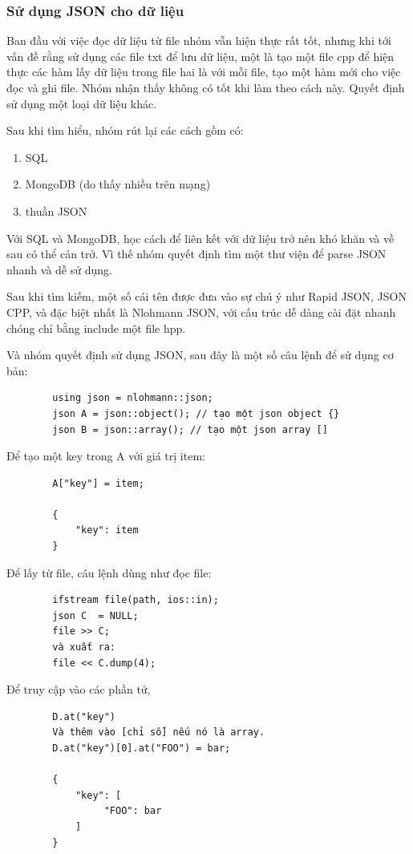 \documentclass[12pt,a4paper]{report}
\begin{document}
		\subsubsection{Sử dụng JSON cho dữ liệu}
		Ban đầu với việc đọc dữ liệu từ file nhóm vẫn hiện thực rất tốt, nhưng khi tới vấn đề rằng sử dụng các file txt để lưu dữ liệu, một là tạo một file cpp để hiện thực các hàm lấy dữ liệu trong file hai là với mỗi file, tạo một hàm mới cho việc đọc và ghi file. Nhóm nhận thấy không có tốt khi làm theo cách này. Quyết định sử dụng một loại dữ liệu khác. \par
		Sau khi tìm hiểu, nhóm rút lại các cách gồm có:
		\begin{enumerate}
			\item SQL
			\item MongoDB (do thấy nhiều trên mạng)
			\item thuần JSON
		\end{enumerate}
		Với SQL và MongoDB, học cách để liên kết với dữ liệu trở nên khó khăn và về sau có thể cản trở. Vì thế nhóm quyết định tìm một thư viện để parse JSON nhanh và dễ sử dụng.\par
		Sau khi tìm kiếm, một số cái tên được đưa vào sự chú ý như Rapid JSON, JSON CPP, và đặc biệt nhất là Nlohmann JSON, với cấu trúc dễ dàng cài đặt nhanh chóng chỉ bằng include một file hpp.\par
		Và nhóm quyết định sử dụng JSON, sau đây là một số câu lệnh để sử dụng cơ bản:
		\begin{verbatim}
		using json = nlohmann::json;
		json A = json::object(); // tạo một json object {}
		json B = json::array(); // tạo một json array []
		\end{verbatim}
		Để tạo một key trong A với giá trị item: 
		\begin{verbatim}
		A["key"] = item; 
		
		{
		    "key": item
		}
		\end{verbatim}
		Để lấy từ file, câu lệnh dùng như đọc file:
		\begin{verbatim}
		ifstream file(path, ios::in);
		json C  = NULL;
		file >> C;
		và xuất ra:
		file << C.dump(4);
		\end{verbatim}
		Để truy cập vào các phần tử, 
		\begin{verbatim}
		D.at("key")
		Và thêm vào [chỉ số] nếu nó là array.
		D.at("key")[0].at("FOO") = bar;

		{
		    "key": [
		         "FOO": bar
		    ]
		}
		\end{verbatim}
		
\end{document}
